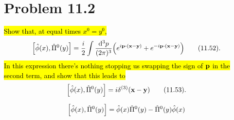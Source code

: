 \documentclass{article}
\begin{document}
\section*{Problem 11.2}
\begin{quoting}
    \hl{Show that, at equal times $x^0=y^0$,}\[\bqty{\hat{\phi}(x),\hat{\Pi}^0(y)}=\frac{i}{2}\int\frac{\dd[3]{p}}{(2\pi)^3}\pqty{e^{i\vb{p\vdot(\vb{x}-\vb{y})}}+e^{-i\vb{p\vdot(\vb{x}-\vb{y})}}}\qquad(11.52).\]\hl{In this expression there's nothing stopping us swapping the sign of $\vb{p}$ in the second term, and show that this leads to}\[\bqty{\hat{\phi}(x),\hat{\Pi}^0(y)}=i\delta^{(3)}(\vb{x}-\vb{y})\qquad(11.53).\]
\end{quoting}

\begin{align*}
    \bqty{\hat{\phi}(x),\hat{\Pi}^0(y)} & =\hat{\phi}(x)\hat{\Pi}^0(y)-\hat{\Pi}^0(y)\hat{\phi}(x) \\
\end{align*}
\end{document}
